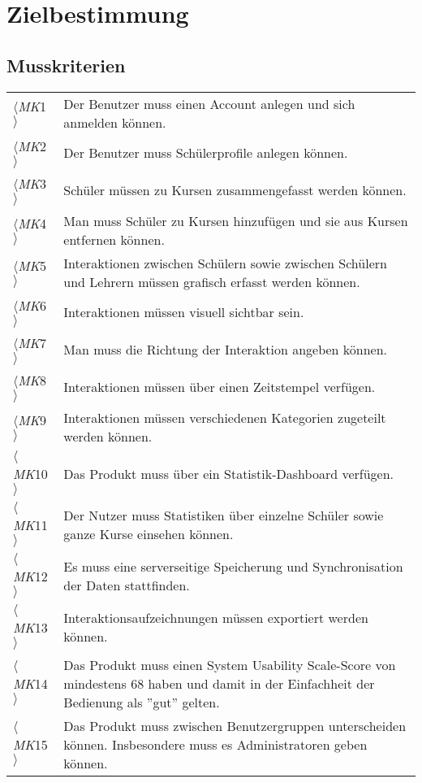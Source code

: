 \section{Zielbestimmung}

\subsection{Musskriterien}
\label{list:Musskriterien}

\begin{tabular}{p{1.1cm}p{12.9cm}}
     $\langle$\textit{MK}1$\rangle$ & Der Benutzer muss einen \Gls{Account} anlegen und sich anmelden können.\\
     $\langle$\textit{MK}2$\rangle$ & Der Benutzer muss Schülerprofile anlegen können.\\
     $\langle$\textit{MK}3$\rangle$ & Schüler müssen zu Kursen zusammengefasst werden können.\\
     $\langle$\textit{MK}4$\rangle$ & Man muss Schüler zu Kursen hinzufügen und sie aus Kursen entfernen können.\\
     $\langle$\textit{MK}5$\rangle$ & Interaktionen zwischen Schülern sowie zwischen Schülern und Lehrern müssen grafisch erfasst werden können.\\
     $\langle$\textit{MK}6$\rangle$ & Interaktionen müssen visuell sichtbar sein.\\
     $\langle$\textit{MK}7$\rangle$ & Man muss die Richtung der Interaktion angeben können.\\
     $\langle$\textit{MK}8$\rangle$ & Interaktionen müssen über einen Zeitstempel verfügen.\\
     $\langle$\textit{MK}9$\rangle$ & Interaktionen müssen verschiedenen Kategorien zugeteilt werden können.\\
     $\langle$\textit{MK}10$\rangle$ & Das Produkt muss über ein Statistik-\Gls{Dashboard} verfügen.\\
     $\langle$\textit{MK}11$\rangle$ & Der Nutzer muss Statistiken über einzelne Schüler sowie ganze Kurse einsehen können.\\
     $\langle$\textit{MK}12$\rangle$ & Es muss eine serverseitige Speicherung und Synchronisation der Daten stattfinden.\\
     $\langle$\textit{MK}13$\rangle$ & Interaktionsaufzeichnungen müssen exportiert werden können.\\
     $\langle$\textit{MK}14$\rangle$ & Das Produkt muss einen  \Gls{System Usability Scale}-Score von mindestens 68 haben und damit in der Einfachheit der Bedienung als ''gut'' gelten.\\
     $\langle$\textit{MK}15$\rangle$ & Das Produkt muss zwischen Benutzergruppen unterscheiden können. Insbesondere muss es \Gls{Administrator}en geben können. \\

     
\end{tabular}

